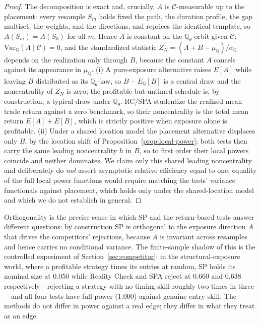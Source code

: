 \begin{proof}
The decomposition is exact and, crucially, $A$ is $\mathcal C$-measurable up to
the placement: every resample $S_m$ holds fixed the path, the duration profile,
the gap multiset, the weights, and the directions, and reprices the identical
template, so $A(S_m)=A(S_0)$ for all $m$. Hence $A$ is constant on the
$\mathbb{Q}_\theta$-orbit given $\mathcal C$: $\mathrm{Var}_{\mathbb Q}(A\mid
\mathcal C)=0$, and the standardized statistic $Z_N=(A+B-\mu_{\mathbb Q})/
\sigma_{\mathbb Q}$ depends on the realization only through $B$, because the
constant $A$ cancels against its appearance in $\mu_{\mathbb Q}$. (i) A
pure-exposure alternative raises $E[A]$ while leaving $B$ distributed as its
$\mathbb{Q}_\theta$-law, so $B-E_{\mathbb Q}[B]$ is a central draw and the
noncentrality of $Z_N$ is zero; the profitable-but-untimed schedule is, by
construction, a typical draw under $\mathbb{Q}_\theta$. RC/SPA studentize the
realized mean trade return against a zero benchmark, so their noncentrality is the
total mean return $E[A]+E[B]$, which is strictly positive when exposure alone is
profitable. (ii) Under a shared location model the placement alternative
displaces only $B$, by the location shift of Proposition~\ref{prop:local-power};
both tests then carry the same leading noncentrality $h$ in $B$, so to first order
their local powers coincide and neither dominates. We claim only this shared
leading noncentrality and deliberately do \emph{not} assert asymptotic relative
efficiency equal to one: equality of the full local power functions would require
matching the tests' variance functionals against placement, which holds only
under the shared-location model and which we do not establish in general.
\end{proof}

Orthogonality is the precise sense in which SP and the return-based tests answer
different questions: by construction SP is orthogonal to the exposure direction
$A$ that drives the competitors' rejections, because $A$ is invariant across
resamples and hence carries no conditional variance. The finite-sample shadow of
this is the controlled experiment of Section~\ref{sec:competitor}: in the
structural-exposure world, where a profitable strategy times its entries at
random, SP holds its nominal size at $0.050$ while Reality Check and SPA reject at
$0.660$ and $0.638$ respectively---rejecting a strategy with no timing skill
roughly two times in three---and all four tests have full power ($1.000$) against
genuine entry skill. The methods do not differ in power against a real edge; they
differ in what they treat as an edge.

